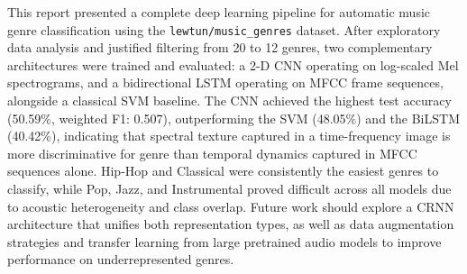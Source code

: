 \documentclass[12pt, a4paper]{article}
\begin{document}
This report presented a complete deep learning pipeline for automatic music genre
classification using the \texttt{lewtun/music\_genres} dataset. After exploratory data
analysis and justified filtering from 20 to 12 genres, two complementary architectures
were trained and evaluated: a 2-D CNN operating on log-scaled Mel spectrograms, and a
bidirectional LSTM operating on MFCC frame sequences, alongside a classical SVM baseline.
The CNN achieved the highest test accuracy (50.59\%, weighted F1: 0.507), outperforming
the SVM (48.05\%) and the BiLSTM (40.42\%), indicating that spectral texture captured in
a time-frequency image is more discriminative for genre than temporal dynamics captured
in MFCC sequences alone. Hip-Hop and Classical were consistently the easiest genres to
classify, while Pop, Jazz, and Instrumental proved difficult across all models due to
acoustic heterogeneity and class overlap. Future work should explore a CRNN architecture
that unifies both representation types, as well as data augmentation strategies and
transfer learning from large pretrained audio models to improve performance on
underrepresented genres.

\newpage

\end{document}
